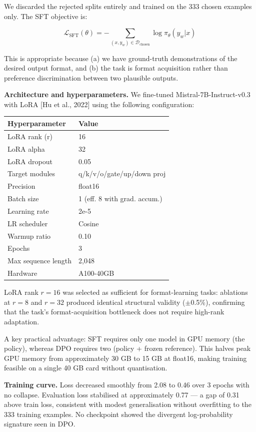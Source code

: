 \documentclass[
  11pt,
]{article}
\newcounter{none} %
\begin{document}
We discarded the rejected splits entirely and trained on the 333 chosen
examples only. The SFT objective is:

\[\mathcal{L}_\text{SFT}(\theta) = -\sum_{(x, y_w) \in \mathcal{D}_\text{chosen}} \log \pi_\theta(y_w | x)\]

This is appropriate because (a) we have ground-truth demonstrations of
the desired output format, and (b) the task is format acquisition rather
than preference discrimination between two plausible outputs.

\textbf{Architecture and hyperparameters.} We fine-tuned
Mistral-7B-Instruct-v0.3 with LoRA {[}Hu et al., 2022{]} using the
following configuration:

{\def\LTcaptype{none} %
\begin{longtable}[]{@{}ll@{}}
\toprule\noalign{}
Hyperparameter & Value \\
\midrule\noalign{}
\endhead
\bottomrule\noalign{}
\endlastfoot
LoRA rank (r) & 16 \\
LoRA alpha & 32 \\
LoRA dropout & 0.05 \\
Target modules & q/k/v/o/gate/up/down proj \\
Precision & float16 \\
Batch size & 1 (eff. 8 with grad. accum.) \\
Learning rate & 2e-5 \\
LR scheduler & Cosine \\
Warmup ratio & 0.10 \\
Epochs & 3 \\
Max sequence length & 2,048 \\
Hardware & A100-40GB \\
\end{longtable}
}

LoRA rank $r=16$ was selected as sufficient for format-learning tasks: ablations at $r=8$ and $r=32$ produced identical structural validity ($\pm$0.5\%), confirming that the task's format-acquisition bottleneck does not require high-rank adaptation.

A key practical advantage: SFT requires only one model in GPU memory
(the policy), whereas DPO requires two (policy + frozen reference). This
halves peak GPU memory from approximately 30 GB to 15 GB at float16,
making training feasible on a single 40 GB card without quantisation.

\textbf{Training curve.} Loss decreased smoothly from 2.08 to 0.46 over
3 epochs with no collapse. Evaluation loss stabilised at approximately
0.77 --- a gap of 0.31 above train loss, consistent with modest
generalisation without overfitting to the 333 training examples. No
checkpoint showed the divergent log-probability signature seen in DPO.
\end{document}

